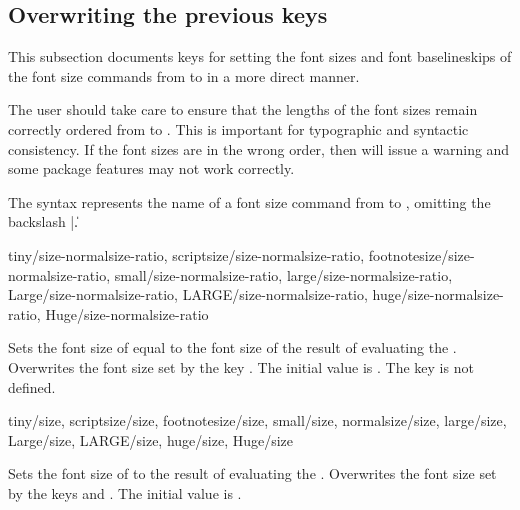 \documentclass{beerydoc}
\begin{document}
\subsection{Overwriting the previous keys}
\label{subsec:overwriting}

This subsection documents keys for setting the font sizes and font
baselineskips of the font size commands from  to  in a more
direct manner.

The user should take care to ensure that the lengths of the font sizes remain
correctly ordered from  to .
This is important for typographic and syntactic consistency.
If the font sizes are in the wrong order, then  will issue
a warning and some package features may not work correctly.

The syntax  represents the name of a font size command
from  to , omitting the backslash |\|.

\begin{variable}
  {
    tiny/size-normalsize-ratio,
    scriptsize/size-normalsize-ratio,
    footnotesize/size-normalsize-ratio,
    small/size-normalsize-ratio,
    large/size-normalsize-ratio,
    Large/size-normalsize-ratio,
    LARGE/size-normalsize-ratio,
    huge/size-normalsize-ratio,
    Huge/size-normalsize-ratio
  }
  \begin{syntax}
  \end{syntax}
  Sets the font size of  equal to the font size
  of  \texttimes{} the result of evaluating the .
  Overwrites the font size set by the key .
  The initial value is .
  The key  is not defined.
\end{variable}

\begin{variable}
  {
    tiny/size,
    scriptsize/size,
    footnotesize/size,
    small/size,
    normalsize/size,
    large/size,
    Large/size,
    LARGE/size,
    huge/size,
    Huge/size
  }
  \begin{syntax}
  \end{syntax}
  Sets the font size of  to the result of
  evaluating the .
  Overwrites the font size set by the keys  and
  .
  The initial value is .
\end{variable}
\end{document}

